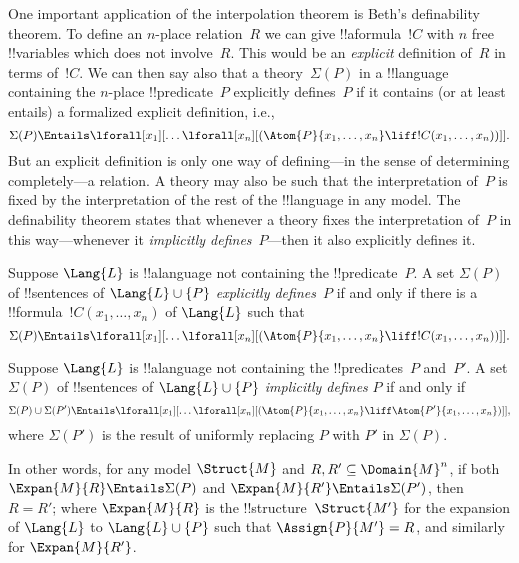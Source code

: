 \documentclass[../../../include/open-logic-section]{subfiles}
\begin{document}

One important application of the interpolation theorem is Beth's
definability theorem.  To define an $n$-place relation~$R$ we can give
!!a{formula}~$!C$ with $n$ free !!{variable}s which does not
involve~$R$. This would be an \emph{explicit} definition of~$R$ in
terms of~$!C$.  We can then say also that a theory~$\Sigma(P)$ in a
!!{language} containing the $n$-place !!{predicate}~$P$ explicitly
defines~$P$ if it contains (or at least entails) a formalized explicit
definition, i.e.,
\[
\Sigma(P) \Entails \lforall[x_1][\dots
  \lforall[x_n][(\Atom{P}{x_1,\dots, x_n} \liff !C(x_1, \dots,
    x_n))]].
\]
But an explicit definition is only one way of defining---in the sense
of determining completely---a relation.  A theory may also be such
that the interpretation of~$P$ is fixed by the interpretation of the
rest of the !!{language} in any model.  The definability theorem
states that whenever a theory fixes the interpretation of~$P$ in this
way---whenever it \emph{implicitly defines}~$P$---then it also
explicitly defines it.

\begin{defn}
Suppose $\Lang{L}$ is !!a{language} not containing the
!!{predicate}~$P$.  A set $\Sigma(P)$ of !!{sentence}s of $\Lang{L}
\cup \{P\}$ \emph{explicitly defines}~$P$ if and only if there is a
!!{formula}~$!C(x_1, \dots, x_n)$ of $\Lang{L}$ such that
\[
\Sigma(P) \Entails \lforall[x_1][\dots
  \lforall[x_n][(\Atom{P}{x_1,\dots, x_n} \liff !C(x_1, \dots,
    x_n))]].
\]
\end{defn}

\begin{defn}
Suppose $\Lang{L}$ is !!a{language} not containing the
!!{predicate}s~$P$ and~$P'$.  A set $\Sigma(P)$ of !!{sentence}s of
$\Lang{L} \cup \{P\}$ \emph{implicitly defines} $P$ if and only if
\[
\Sigma(P) \cup \Sigma(P') \Entails \lforall[x_1][\dots
  \lforall[x_n][(\Atom{P}{x_1,\dots, x_n} \liff \Atom{P'}{x_1,\dots,
      x_n})]],
\]
where $\Sigma(P')$ is the result of uniformly replacing $P$ with $P'$
in $\Sigma(P)$.
\end{defn}

In other words, for any model $\Struct{M}$ and $R, R' \subseteq
\Domain{M}^n$, if both $\Expan{M}{R} \Entails \Sigma(P)$ and
$\Expan{M}{R'} \Entails \Sigma(P')$, then $R=R'$; where
$\Expan{M}{R}$ is the !!{structure}~$\Struct{M'}$ for the
expansion of $\Lang{L}$ to $\Lang{L} \cup \{P\}$ such that
$\Assign{P}{M'} = R$, and similarly for $\Expan{M}{R'}$.
\end{document}

